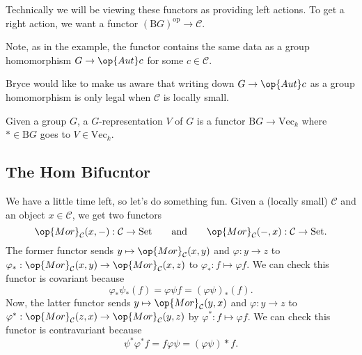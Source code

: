 \begin{remark}
	Technically we will be viewing these functors as providing left actions. To get a right action, we want a functor $(\mathrm BG)^\mathrm{op}\to\mathcal C$.
\end{remark}
Note, as in the example, the functor contains the same data as a group homomorphism $G\to\op{Aut}c$ for some $c\in\mathcal C$.
\begin{remark}
	Bryce would like to make us aware that writing down $G\to\op{Aut}c$ as a group homomorphism is only legal when $\mathcal C$ is locally small.
\end{remark}
\begin{example}
	Given a group $G$, a $G$-representation $V$ of $G$ is a functor $\mathrm BG\to\mathrm{Vec}_k$ where $*\in\mathrm BG$ goes to $V\in\mathrm{Vec}_k$.
\end{example}

\subsection{The \textrm{Hom} Bifucntor}
We have a little time left, so let's do something fun. Given a (locally small) $\mathcal C$ and an object $x\in\mathcal C$, we get two functors
\[\op{Mor}_\mathcal C(x,-):\mathcal C\to\mathrm{Set}\qquad\text{and}\qquad\op{Mor}_\mathcal C(-,x):\mathcal C\to\mathrm{Set}.\]
The former functor sends $y\mapsto\op{Mor}_\mathcal C(x,y)$ and $\varphi:y\to z$ to $\varphi_*:\op{Mor}_\mathcal C(x,y)\to\op{Mor}_\mathcal C(x,z)$ to $\varphi_*:f\mapsto\varphi f$. We can check this functor is covariant because
\[\varphi_*\psi_*(f)=\varphi\psi f=(\varphi\psi)_*(f).\]
Now, the latter functor sends $y\mapsto\op{Mor}_\mathcal C(y,x)$ and $\varphi:y\to z$ to $\varphi^*:\op{Mor}_\mathcal C(z,x)\to\op{Mor}_\mathcal C(y,z)$ by $\varphi^*:f\mapsto\varphi f$. We can check this functor is contravariant because
\[\psi^*\varphi^*f=f\varphi\psi=(\varphi\psi)*f.\]